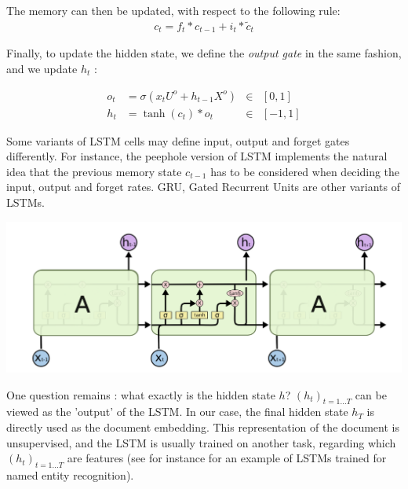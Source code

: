 \documentclass{article}
\begin{document}
\noindent The memory can then be updated, with respect to the following rule:
\begin{align*}
    c_t = f_t * c_{t-1} + i_t * \tilde{c}_t
\end{align*}

\noindent Finally, to update the hidden state, we define the \textit{output gate} in the same fashion, and we update $h_t$ :

\begin{align*}
    o_t &= \sigma \left (x_t U^o + h_{t-1} X^{o}\right ) &\in& [0,1]  \\
    h_t &= \tanh (c_t) * o_t  &\in& [-1, 1]
\end{align*}




Some variants of LSTM cells may define input, output and forget gates differently. For instance,
the peephole version of LSTM implements the natural idea that the previous memory state $c_{t-1}$
has to be considered when deciding the input, output and forget rates.  GRU, Gated Recurrent Units 
are other variants of LSTMs. \\ \par 

\begin{center}
    \label{fig:LSTM1}
    \includegraphics[scale=0.3]{LSTM.png}
\end{center}
One question remains : what exactly is the hidden state $h$? 
$(h_t)_{t=1...T}$ can be viewed as the 'output' of the LSTM.  
In our case, the final hidden state $h_T$ is directly used as 
the document embedding. This representation of the document 
is unsupervised, and the LSTM is usually trained on another 
task, regarding which $(h_t)_{t=1...T}$ are features (see for 
instance \cite{Lample_2016} for an example of LSTMs trained 
for named entity recognition). \\


\end{document}
